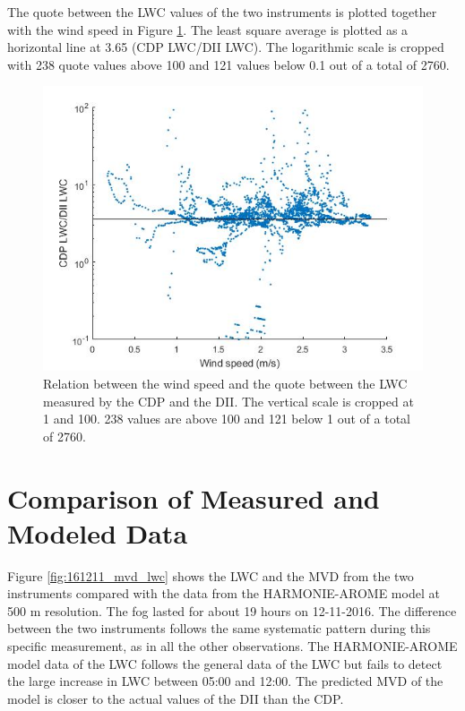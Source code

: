\clearpage
The quote between the LWC values of the two instruments is plotted together with the wind speed in Figure \ref{fig:0228-0301_WSvslwcquote}. The least square average is plotted as a horizontal line at 3.65 (CDP LWC/DII LWC). The logarithmic scale is cropped with 238 quote values above 100 and 121 values below 0.1 out of a total of 2760.

\begin{figure}[ht]
  \centering
  \includegraphics[width=0.85\linewidth]{figures/0228-0301/Relation_between_lwcquote_and_wind_speed_17022801-17030123}
\caption{Relation between the wind speed and the quote between the LWC measured by the CDP and the DII. The vertical scale is cropped at 1 and 100. 238 values are above 100 and 121 below 1 out of a total of 2760.}
\label{fig:0228-0301_WSvslwcquote}
\end{figure}

\clearpage
\section{Comparison of Measured and Modeled Data}

Figure \ref{fig:161211_mvd_lwc} shows the LWC and the MVD from the two instruments compared with the data from the HARMONIE-AROME model at 500 m resolution. The fog lasted for about 19 hours on 12-11-2016. The difference between the two instruments follows the same systematic pattern during this specific measurement, as in all the other observations. The HARMONIE-AROME model data of the LWC follows the general data of the LWC but fails to detect the large increase in LWC between 05:00 and 12:00. The predicted MVD of the model is closer to the actual values of the DII than the CDP.

